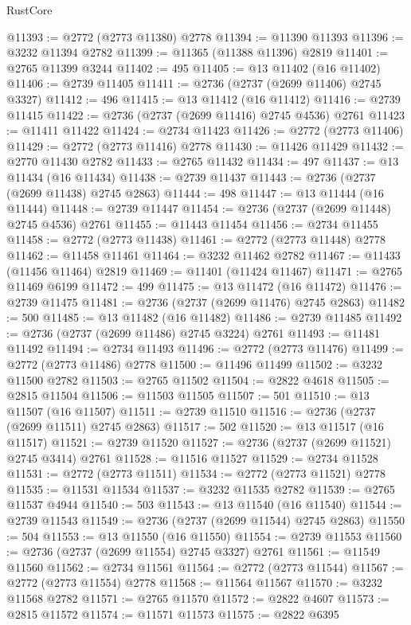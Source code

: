 \begin{lexlean}{RustCore}
\begin{coremodule}
@11393 := @2772 (@2773 @11380) @2778
@11394 := @11390 @11393
@11396 := @3232 @11394 @2782
@11399 := @11365 (@11388 @11396) @2819
@11401 := @2765 @11399 @3244
@11402 := 495
@11405 := @13 @11402 (@16 @11402)
@11406 := @2739 @11405
@11411 := @2736 (@2737 (@2699 @11406) @2745 @3327)
@11412 := 496
@11415 := @13 @11412 (@16 @11412)
@11416 := @2739 @11415
@11422 := @2736 (@2737 (@2699 @11416) @2745 @4536) @2761
@11423 := @11411 @11422
@11424 := @2734 @11423
@11426 := @2772 (@2773 @11406)
@11429 := @2772 (@2773 @11416) @2778
@11430 := @11426 @11429
@11432 := @2770 @11430 @2782
@11433 := @2765 @11432
@11434 := 497
@11437 := @13 @11434 (@16 @11434)
@11438 := @2739 @11437
@11443 := @2736 (@2737 (@2699 @11438) @2745 @2863)
@11444 := 498
@11447 := @13 @11444 (@16 @11444)
@11448 := @2739 @11447
@11454 := @2736 (@2737 (@2699 @11448) @2745 @4536) @2761
@11455 := @11443 @11454
@11456 := @2734 @11455
@11458 := @2772 (@2773 @11438)
@11461 := @2772 (@2773 @11448) @2778
@11462 := @11458 @11461
@11464 := @3232 @11462 @2782
@11467 := @11433 (@11456 @11464) @2819
@11469 := @11401 (@11424 @11467)
@11471 := @2765 @11469 @6199
@11472 := 499
@11475 := @13 @11472 (@16 @11472)
@11476 := @2739 @11475
@11481 := @2736 (@2737 (@2699 @11476) @2745 @2863)
@11482 := 500
@11485 := @13 @11482 (@16 @11482)
@11486 := @2739 @11485
@11492 := @2736 (@2737 (@2699 @11486) @2745 @3224) @2761
@11493 := @11481 @11492
@11494 := @2734 @11493
@11496 := @2772 (@2773 @11476)
@11499 := @2772 (@2773 @11486) @2778
@11500 := @11496 @11499
@11502 := @3232 @11500 @2782
@11503 := @2765 @11502
@11504 := @2822 @4618
@11505 := @2815 @11504
@11506 := @11503 @11505
@11507 := 501
@11510 := @13 @11507 (@16 @11507)
@11511 := @2739 @11510
@11516 := @2736 (@2737 (@2699 @11511) @2745 @2863)
@11517 := 502
@11520 := @13 @11517 (@16 @11517)
@11521 := @2739 @11520
@11527 := @2736 (@2737 (@2699 @11521) @2745 @3414) @2761
@11528 := @11516 @11527
@11529 := @2734 @11528
@11531 := @2772 (@2773 @11511)
@11534 := @2772 (@2773 @11521) @2778
@11535 := @11531 @11534
@11537 := @3232 @11535 @2782
@11539 := @2765 @11537 @4944
@11540 := 503
@11543 := @13 @11540 (@16 @11540)
@11544 := @2739 @11543
@11549 := @2736 (@2737 (@2699 @11544) @2745 @2863)
@11550 := 504
@11553 := @13 @11550 (@16 @11550)
@11554 := @2739 @11553
@11560 := @2736 (@2737 (@2699 @11554) @2745 @3327) @2761
@11561 := @11549 @11560
@11562 := @2734 @11561
@11564 := @2772 (@2773 @11544)
@11567 := @2772 (@2773 @11554) @2778
@11568 := @11564 @11567
@11570 := @3232 @11568 @2782
@11571 := @2765 @11570
@11572 := @2822 @4607
@11573 := @2815 @11572
@11574 := @11571 @11573
@11575 := @2822 @6395

\end{coremodule}
\end{lexlean}
